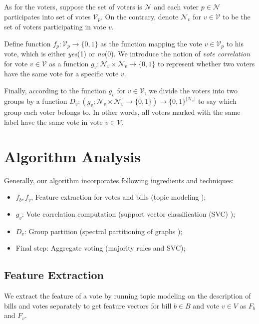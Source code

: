 \documentclass{article} %
\begin{document}
    As for the voters, suppose the set of voters is $\mathcal N$ and each voter $p \in \mathcal N$ participates into set of votes $\mathcal V_p$. On the contrary, denote $\mathcal N_v$ for $v \in \mathcal V$ to be the set of voters participating in vote $v$. 
    
    Define function $f_p: \mathcal V_p \to \{0,1\}$ as the function mapping the vote $v \in \mathcal V_p$ to his vote, which is either {\em yes}(1) or {\em no}(0). We introduce the notion of {\em vote correlation} for vote $v \in \mathcal V$ as a function $g_v: \mathcal N_v \times \mathcal N_v \to \{0, 1\}$ to represent whether two voters have the same vote for a specific vote $v$.
    
    Finally, according to the function $g_v$ for $v \in \mathcal V$, we divide the voters into two groups by a function $D_v : (g_v: \mathcal N_v \times \mathcal N_v \to \{0, 1\}) \to \{0, 1\}^{|\mathcal N_v|}$ to say which group each voter belongs to. In other words, all voters marked with the same label have the same vote in vote $v \in \mathcal V$.
    
\section{Algorithm Analysis}

Generally, our algorithm incorporates following ingredients and techniques:
\begin{itemize}
    \item $f_b, f_v$, Feature extraction for votes and bills (topic modeling \cite{graham2012getting,conf/icml/AroraGHMMSWZ13});
    \item $g_v$: Vote correlation computation (support vector classification (SVC) \cite{hsu2003practical});
    \item $D_v$: Group partition (spectral partitioning of graphs \cite{mcsherry2001spectral,kumar2010clustering});
    \item Final step: Aggregate voting (majority rules \cite{mcgann2004tyranny} and SVC);
\end{itemize}

\subsection{Feature Extraction}    
    We extract the feature of a vote by running topic modeling on the description of bills and votes separately to get feature vectors for bill $b \in B$ and vote $v \in V$ as $F_b$ and $F_v$.
    
\end{document}
